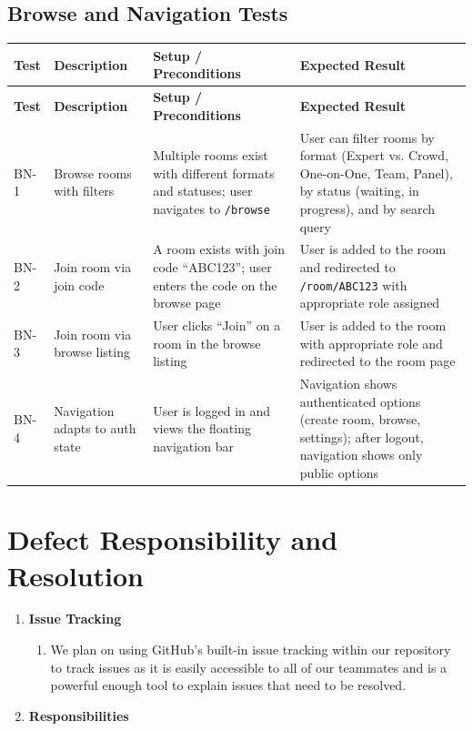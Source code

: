 \documentclass[12pt]{article}
\begin{document}
\subsection{Browse and Navigation Tests}

\begin{longtable}{|p{1.5cm}|p{3cm}|p{4cm}|p{4cm}|}
\hline
\textbf{Test} & \textbf{Description} & \textbf{Setup / Preconditions} & \textbf{Expected Result} \\
\hline
\endfirsthead
\hline
\textbf{Test} & \textbf{Description} & \textbf{Setup / Preconditions} & \textbf{Expected Result} \\
\hline
\endhead
BN-1 & Browse rooms with filters & Multiple rooms exist with different formats and statuses; user navigates to \texttt{/browse} & User can filter rooms by format (Expert vs. Crowd, One-on-One, Team, Panel), by status (waiting, in progress), and by search query \\
\hline
BN-2 & Join room via join code & A room exists with join code ``ABC123''; user enters the code on the browse page & User is added to the room and redirected to \texttt{/room/ABC123} with appropriate role assigned \\
\hline
BN-3 & Join room via browse listing & User clicks ``Join'' on a room in the browse listing & User is added to the room with appropriate role and redirected to the room page \\
\hline
BN-4 & Navigation adapts to auth state & User is logged in and views the floating navigation bar & Navigation shows authenticated options (create room, browse, settings); after logout, navigation shows only public options \\
\hline
\end{longtable}

\newpage

\section{Defect Responsibility and Resolution}

\begin{enumerate}
    \item \textbf{Issue Tracking}
    \begin{enumerate}[label=(\alph*)]
        \item We plan on using GitHub's built-in issue tracking within our repository to track issues as it is easily accessible to all of our teammates and is a powerful enough tool to explain issues that need to be resolved.
    \end{enumerate}

    \item \textbf{Responsibilities}
\end{enumerate}
\end{document}
